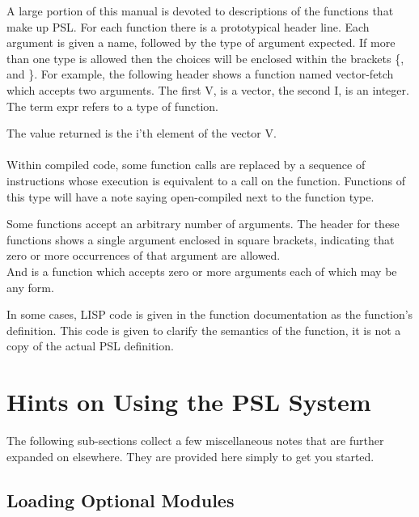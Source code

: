 A large portion of this manual is devoted  to  descriptions
of the functions that make up PSL.  For each function there is a
prototypical  header  line.    Each  argument  is  given a name,
followed by the type of argument expected.   If  more  than  one
type  is  allowed  then  the choices will be enclosed within the
brackets \{, and \}.  For example, the following  header  shows  a
function  named  vector-fetch  which accepts two arguments.  The
first V, is a vector, the second I, is an  integer.    The  term
expr  refers  to  a  type  of function.

{The value returned is the i'th element of the vector V.}\\
\\

\noindent
Within compiled code, some function calls are  replaced  by  a
sequence of instructions whose execution is equivalent to a call
on the function.  Functions of this type will have a note saying
open-compiled next to the function type.

\noindent
Some  functions  accept an arbitrary number of arguments.  The
header for these functions shows a single argument  enclosed  in
square  brackets,  indicating  that  zero or more occurrences of
that argument are allowed.\\

{}
{And is a function which accepts zero or more arguments each of
which may be any form.}

\noindent
In  some  cases,  LISP  code  is   given   in   the   function
documentation  as the function's definition.  This code is given
to clarify the semantics of the function, it is not  a  copy  of
the actual PSL definition.



\section{Hints on Using the PSL System}

The following sub-sections collect a few  miscellaneous  notes
that  are further expanded on elsewhere.  They are provided here
simply to get you started.


\subsection{Loading Optional Modules}


